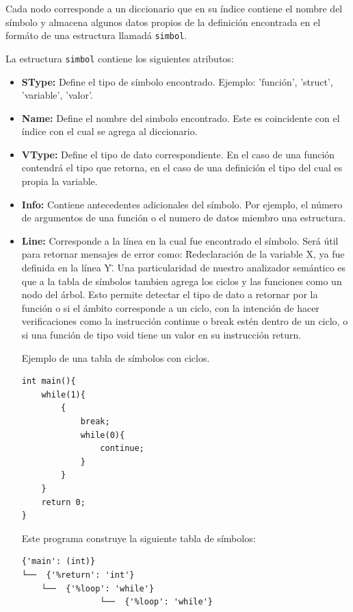 \documentclass[12pt]{article}
\begin{document}
Cada nodo corresponde a un diccionario que en su \'indice contiene el nombre del s\'imbolo y almacena algunos datos propios de la definici\'on encontrada en el form\'ato de una estructura llamad\'a \texttt{simbol}. 

La estructura \texttt{simbol} contiene los siguientes atributos:

\begin{itemize}
    \item  \textbf{SType:} Define el tipo de s\'imbolo encontrado. Ejemplo: 'funci\'on', 'struct', 'variable', 'valor'.
    \item  \textbf{Name:} Define el nombre del simbolo encontrado. Este es coincidente con el \'indice con el cual se agrega al diccionario.
    \item  \textbf{VType:} Define el tipo de dato correspondiente. En el caso de una funci\'on contendr\'a el tipo que retorna, en el caso de una definici\'on el tipo del cual es propia la variable. 
    \item  \textbf{Info:} Contiene antecedentes adicionales del s\'imbolo. Por ejemplo, el n\'umero de argumentos de una funci\'on o el numero de datos miembro una estructura. 
    \item  \textbf{Line:} Corresponde a la l\'inea en la cual fue encontrado el s\'imbolo. Ser\'a \'util para retornar mensajes de error como: \"Redeclaraci\'on de la variable X, ya fue definida en la l\'inea Y\". 
\clearpage
Una particularidad de nuestro analizador sem\'antico es que a la tabla de s\'imbolos tambien agrega los ciclos y las funciones como un nodo del \'arbol. Esto permite detectar el tipo de dato a retornar por la funci\'on o si el \'ambito corresponde a un ciclo, con la intenci\'on de hacer verificaciones como la instrucci\'on continue o break est\'en dentro de un ciclo, o si una funci\'on de tipo void tiene un valor en su instrucci\'on return.

Ejemplo de una tabla de s\'imbolos con ciclos.

\begin{verbatim}
int main(){
    while(1){
        {
            break;
            while(0){
                continue;
            }
        }
    }
    return 0;
}
\end{verbatim}

Este programa construye la siguiente tabla de s\'imbolos:
\begin{verbatim}
{'main': (int)}
└──  {'%return': 'int'}
    └──  {'%loop': 'while'}
                └──  {'%loop': 'while'}
\end{verbatim}




\end{itemize}
\end{document}
